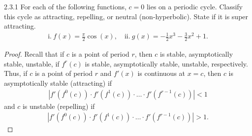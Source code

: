 \begin{problem}{2.3.1}
  For each of the following functions, $c=0$ lies on a periodic cycle. Classify
  this cycle as attracting, repelling, or neutral (non-hyperbolic). State if
  it is super attracting.
  \begin{align*}
    \text{i}.\  f(x) = \frac{\pi}{2} \cos(x),\quad \text{ii}.\ g(x) = -\frac{1}{2}x^3 - \frac{3}{2}x^2 + 1.
  \end{align*}
\end{problem}

\begin{proof}
  Recall that if $c$ is a point of period $r$, then $c$ is stable, asymptotically stable, unstable,
  if $f^r(c)$ is stable, asymptotically stable, unstable, respectively. Thus,
  if $c$ is a point of period $r$ and $f'(x)$ is continuous at $x=c$,
  then $c$ is asymptotically stable (attracting) if
  \begin{align*}
    \left|f'(f^0(c))\cdot f'(f^1(c)) \cdot \dots \cdot f'(f^{r-1}(c))\right| < 1
  \end{align*}
  and $c$ is unstable (repelling) if
  \begin{align*}
    \left|f'(f^0(c))\cdot f'(f^1(c)) \cdot \dots \cdot f'(f^{r-1}(c))\right| > 1.
  \end{align*}


\end{proof}
